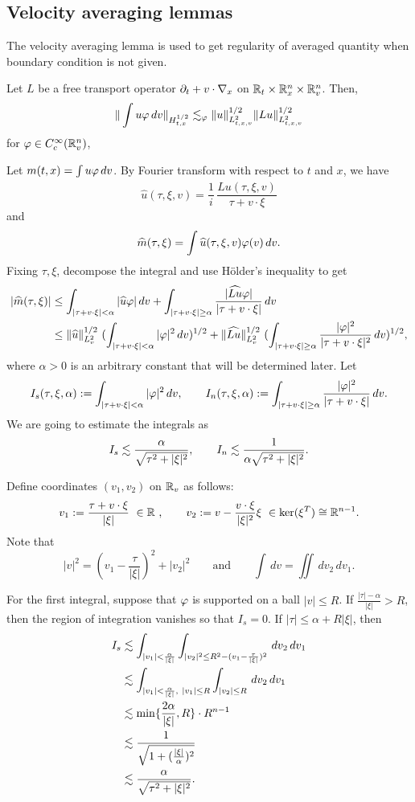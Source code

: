 \documentclass[11pt]{article}
\begin{document}
\subsection{Velocity averaging lemmas}
The velocity averaging lemma is used to get regularity of averaged quantity when boundary condition is not given.
\begin{thm}
Let $L$ be a free transport operator $\pd_t+v\cdot\del_x$ on $\mathbb{R}_t\times\mathbb{R}_x^n\times\mathbb{R}_v^n$.
Then,
\[\|\int u\varphi\,dv\|_{H_{t,x}^{1/2}}\lesssim_\varphi\|u\|_{L_{t,x,v}^2}^{1/2}\|Lu\|_{L_{t,x,v}^2}^{1/2}\]
for $\varphi\in C_c^\infty(\mathbb{R}_v^n)$,
\end{thm}
\begin{pf}
Let $m(t,x)=\int u\varphi\,dv$.
By Fourier transform with respect to $t$ and $x$, we have
\[\hat u(\tau,\xi,v)=\frac1i\,\frac{\hat{Lu}(\tau,\xi,v)}{\tau+v\cdot\xi}\]
and
\[\widehat m(\tau,\xi)=\int\widehat u(\tau,\xi,v)\varphi(v)\,dv.\]
Fixing $\tau,\xi$, decompose the integral and use H\"older's inequality to get
\begin{align*}
|\hat m(\tau,\xi)|
&\le\int_{|\tau+v\cdot\xi|<\alpha}|\hat u\f|\,dv+\int_{|\tau+v\cdot\xi|\ge\alpha}\frac{|\hat{Lu}\f|}{|\tau+v\cdot\xi|}\,dv\\
&\le\|\hat u\|_{L_v^2}^{1/2}\ (\int_{|\tau+v\cdot\xi|<\alpha}|\f|^2\,dv)^{1/2}+\|\hat{Lu}\|_{L_v^2}^{1/2}\ (\int_{|\tau+v\cdot\xi|\ge\alpha}\frac{|\f|^2}{|\tau+v\cdot\xi|^2}\,dv)^{1/2},
\end{align*}
where $\alpha>0$ is an arbitrary constant that will be determined later.
Let
\[I_s(\tau,\xi,\alpha):=\int_{|\tau+v\cdot\xi|<\alpha}|\varphi|^2\,dv,\qquad
I_n(\tau,\xi,\alpha):=\int_{|\tau+v\cdot\xi|\ge\alpha}\frac{|\varphi|^2}{|\tau+v\cdot\xi|}\,dv.\]
We are going to estimate the integrals as
\[I_s\lesssim\frac{\alpha}{\sqrt{\tau^2+|\xi|^2}},\qquad
I_n\lesssim\frac1{\alpha\sqrt{\tau^2+|\xi|^2}}.\]

Define coordinates $(v_1,v_2)$ on $\mathbb{R}_v$ as follows:
\[v_1:=\frac{\tau+v\cdot\xi}{|\xi|}\ \in\R\ ,\qquad v_2:=v-\frac{v\cdot\xi}{|\xi|^2}\xi\ \in\ker(\xi^T)\cong\R^{n-1}.\]
Note that
\[|v|^2=(v_1-\frac\tau{|\xi|})^2+|v_2|^2\qquad\text{and}\qquad\int\,dv=\iint\,dv_2\,dv_1.\]

For the first integral, suppose that $\varphi$ is supported on a ball $|v|\le R$.
If $\frac{|\tau|-\alpha}{|\xi|}>R$, then the region of integration vanishes so that $I_s=0$.
If $|\tau|\le\alpha+R|\xi|$, then
\begin{align*}
I_s&\lesssim\int_{|v_1|<\frac\alpha{|\xi|}}\int_{|v_2|^2\le R^2-(v_1-\frac\tau{|\xi|})^2}\,dv_2\,dv_1\\
&\lesssim\int_{|v_1|<\frac\alpha{|\xi|},\ |v_1|\le R}\int_{|v_2|\le R}\,dv_2\,dv_1\\
&\lesssim\min\{\frac{2\alpha}{|\xi|},R\}\cdot R^{n-1}\\
&\lesssim\frac1{\sqrt{1+(\frac{|\xi|}\alpha)^2}}\\
&\lesssim\frac\alpha{\sqrt{\tau^2+|\xi|^2}}.
\end{align*}


\end{pf}
\end{document}
